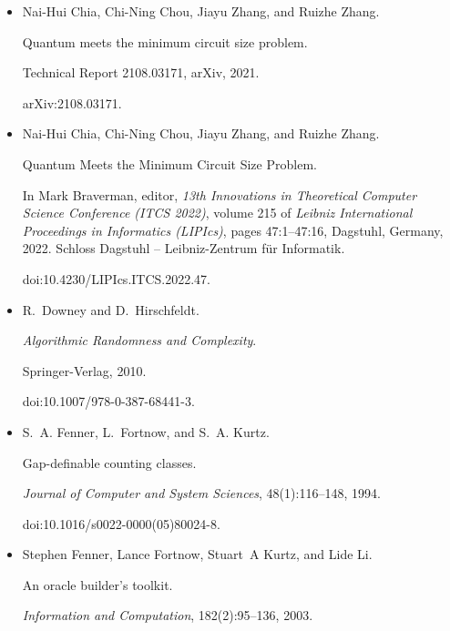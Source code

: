 \documentclass[10pt,a4paper]{article}
\begin{document}
\begin{itemize}
\item[] 
[15]

Nai-Hui Chia, Chi-Ning Chou, Jiayu Zhang, and Ruizhe Zhang.


Quantum meets the minimum circuit size problem.


Technical Report 2108.03171, arXiv, 2021.


arXiv:2108.03171.





\item[] 
[16]

Nai-Hui Chia, Chi-Ning Chou, Jiayu Zhang, and Ruizhe Zhang.


Quantum Meets the Minimum Circuit Size Problem.


In Mark Braverman, editor, \emph{13th Innovations in Theoretical
Computer Science Conference (ITCS 2022)}, volume 215 of \emph{Leibniz
International Proceedings in Informatics (LIPIcs)}, pages 47:1–47:16,
Dagstuhl, Germany, 2022. Schloss Dagstuhl – Leibniz-Zentrum für
Informatik.


doi:10.4230/LIPIcs.ITCS.2022.47.





\item[] 
[17]

R. Downey and D. Hirschfeldt.


\emph{Algorithmic Randomness and Complexity}.


Springer-Verlag, 2010.


doi:10.1007/978-0-387-68441-3.





\item[] 
[18]

S. A. Fenner, L. Fortnow, and S. A. Kurtz.


Gap-definable counting classes.


\emph{Journal of Computer and System Sciences}, 48(1):116–148, 1994.


doi:10.1016/s0022-0000(05)80024-8.





\item[] 
[19]

Stephen Fenner, Lance Fortnow, Stuart A Kurtz, and Lide Li.


An oracle builder’s toolkit.


\emph{Information and Computation}, 182(2):95–136, 2003.



\end{itemize}
\end{document}
